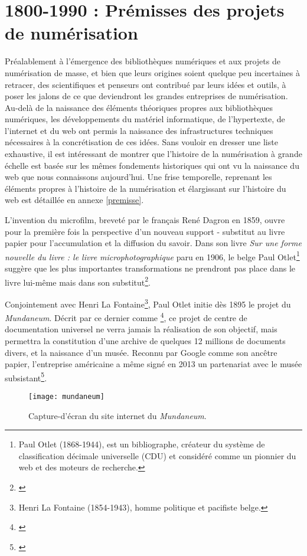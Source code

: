 \section{1800-1990 : Prémisses des projets de numérisation}
Préalablement à l'émergence des bibliothèques numériques et aux projets de numérisation de masse, et bien que leurs origines soient quelque peu incertaines à retracer, des scientifiques et penseurs ont contribué par leurs idées et outils, à poser les jalons de ce que deviendront les grandes entreprises de numérisation. Au-delà de la naissance des éléments théoriques propres aux bibliothèques numériques, les développements du matériel informatique, de l'hypertexte, de l'internet et du web ont permis la naissance des infrastructures techniques nécessaires à la concrétisation de ces idées. Sans vouloir en dresser une liste exhaustive, il est intéressant de montrer que l'histoire de la numérisation à grande échelle est basée sur les mêmes fondements historiques qui ont vu la naissance du web que nous connaissons aujourd'hui. 
Une frise temporelle, reprenant les éléments propres à l'histoire de la numérisation et élargissant sur l'histoire du web est détaillée en annexe \ref{premisse}.

L'invention du microfilm, breveté par le français René Dagron en 1859, ouvre pour la première fois la perspective d'un nouveau support - substitut au livre papier pour l'accumulation et la diffusion du savoir. Dans son livre \emph{Sur une forme nouvelle du livre : le livre microphotographique} paru en 1906, le belge Paul Otlet\footnote{Paul Otlet (1868-1944), est un bibliographe, créateur du système de classification décimale universelle (CDU) et considéré comme un pionnier du web et des moteurs de recherche.} suggère que les plus importantes transformations ne prendront pas place dans le livre lui-même mais dans son substitut\footnote{\cite[p. 7]{thylstrup_politics_2018}}.

Conjointement avec Henri La Fontaine\footnote{Henri La Fontaine (1854-1943), homme politique et pacifiste belge.}, Paul Otlet initie dès 1895 le projet du \textit{Mundaneum}. Décrit par ce dernier comme \footnote{\cite[p. 8]{thylstrup_politics_2018}}, ce projet de centre de documentation universel ne verra jamais la réalisation de son objectif, mais permettra la constitution d'une archive de quelques 12 millions de documents divers, et la naissance d'un musée. Reconnu par Google comme son ancêtre papier, l'entreprise américaine a même signé en 2013 un partenariat avec le musée subsistant\footnote{\cite[p. 8]{thylstrup_politics_2018}}.
\newpage
\begin{figure}[H]%
\centering
\texttt{[image: mundaneum]}
\caption{Capture-d'écran du site internet du \textit{Mundaneum}.}
\end{figure}

